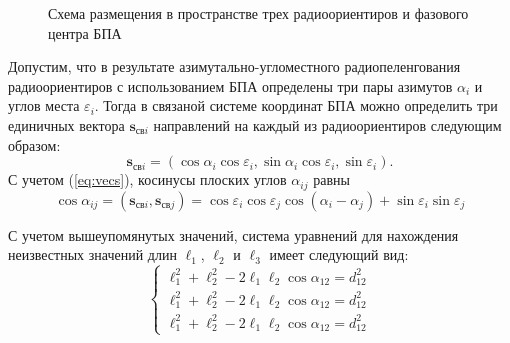 \documentclass[a4paper,12pt]{article}
\begin{document}
\begin{figure}[htbp]
    \begin{center}


    \caption{Схема размещения в пространстве трех радиоориентиров и фазового центра БПА}
    \label{pic:tetrahedron}
    \end{center}
\end{figure}

Допустим, что в результате азимутально-угломестного радиопеленгования радиоориентиров с использованием
БПА определены три пары азимутов $\alpha_{i}$ и углов места $\varepsilon_{i}$. Тогда в связаной системе
координат БПА можно определить три единичных вектора $\mathbf{s}_{\text{св}i}$ направлений на каждый
из радиоориентиров следующим образом:
\begin{equation}\label{eq:vecs}
    \mathbf{s}_{\text{св}i} = \left(\cos\alpha_i \cos\varepsilon_i, \sin\alpha_i\cos\varepsilon_i, \sin\varepsilon_i\right).
\end{equation}
С учетом (\ref{eq:vecs}), косинусы плоских углов $\alpha_{ij}$ равны
\begin{equation}
    \cos\alpha_{ij} = \left(\mathbf{s}_{\text{св}i}, \mathbf{s}_{\text{св}j}\right) =
    \cos\varepsilon_i \cos\varepsilon_j \cos\left(\alpha_i - \alpha_j\right) + \sin\varepsilon_i \sin\varepsilon_j
\end{equation}

С учетом вышеупомянутых значений, система уравнений для нахождения неизвестных значений длин $\ell_1$, $\ell_2$
и $\ell_3$ имеет следующий вид:
\begin{equation} \label{eq:system}
    \begin{cases}
    \ell_1^2 + \ell_2^2 - 2 \ell_1 \ell_2 \cos\alpha_{12} = d_{12}^2 \\
    \ell_1^2 + \ell_2^2 - 2 \ell_1 \ell_2 \cos\alpha_{12} = d_{12}^2 \\
    \ell_1^2 + \ell_2^2 - 2 \ell_1 \ell_2 \cos\alpha_{12} = d_{12}^2
    \end{cases}
\end{equation}
\end{document}
